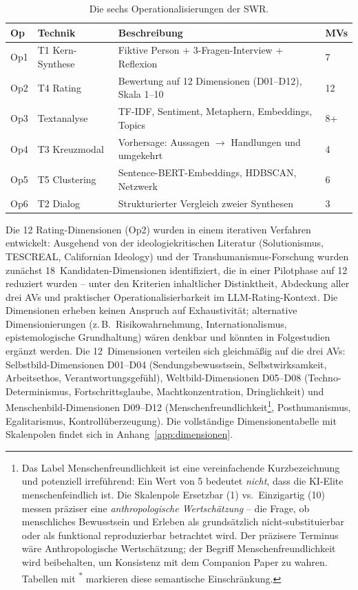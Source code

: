 \documentclass[12pt,a4paper]{article}
\begin{document}
\begin{table}[htbp]
  \centering
  \caption{Die sechs Operationalisierungen der SWR.}
  \label{tab:ops}
  \small
  \begin{tabularx}{\textwidth}{l l X l}
    \toprule
    \textbf{Op} & \textbf{Technik} & \textbf{Beschreibung} & \textbf{MVs} \\
    \midrule
    Op1 & T1 Kern-Synthese & Fiktive Person + 3-Fragen-Interview + Reflexion & 7 \\
    Op2 & T4 Rating & Bewertung auf 12 Dimensionen (D01--D12), Skala 1--10 & 12 \\
    Op3 & Textanalyse & TF-IDF, Sentiment, Metaphern, Embeddings, Topics & 8+ \\
    Op4 & T3 Kreuzmodal & Vorhersage: Aussagen $\to$ Handlungen und umgekehrt & 4 \\
    Op5 & T5 Clustering & Sentence-BERT-Embeddings, HDBSCAN, Netzwerk & 6 \\
    Op6 & T2 Dialog & Strukturierter Vergleich zweier Synthesen & 3 \\
    \bottomrule
  \end{tabularx}
\end{table}

Die 12 Rating-Dimensionen (Op2) wurden in einem iterativen Verfahren entwickelt: Ausgehend von der ideologiekritischen Literatur (Solutionismus, TESCREAL, Californian Ideology) und der Transhumanismus-Forschung wurden zun\"achst 18~Kandidaten-Dimensionen identifiziert, die in einer Pilotphase auf 12 reduziert wurden -- unter den Kriterien inhaltlicher Distinktheit, Abdeckung aller drei AVs und praktischer Operationalisierbarkeit im LLM-Rating-Kontext. Die Dimensionen erheben keinen Anspruch auf Exhaustivit\"at; alternative Dimensionierungen (z.\,B.\ Risikowahrnehmung, Internationalismus, epistemologische Grundhaltung) w\"aren denkbar und k\"onnten in Folgestudien erg\"anzt werden. Die 12~Dimensionen verteilen sich gleichm\"a\ss{}ig auf die drei AVs: Selbstbild-Dimensionen D01--D04 (Sendungsbewusstsein, Selbstwirksamkeit, Arbeitsethos, Verantwortungsgef\"uhl), Weltbild-Dimensionen D05--D08 (Techno-Determinismus, Fortschrittsglaube, Machtkonzentration, Dringlichkeit) und Menschenbild-Dimensionen D09--D12 (Menschenfreundlichkeit\footnote{Das Label \glqq Menschenfreundlichkeit\grqq{} ist eine vereinfachende Kurzbezeichnung und potenziell irref\"uhrend: Ein Wert von 5 bedeutet \emph{nicht}, dass die KI-Elite \glqq menschenfeindlich\grqq{} ist. Die Skalenpole \glqq Ersetzbar\grqq{} (1) vs.\ \glqq Einzigartig\grqq{} (10) messen pr\"aziser eine \emph{anthropologische Wertsch\"atzung} -- die Frage, ob menschliches Bewusstsein und Erleben als grunds\"atzlich nicht-substituierbar oder als funktional reproduzierbar betrachtet wird. Der pr\"azisere Terminus w\"are \glqq Anthropologische Wertsch\"atzung\grqq; der Begriff \glqq Menschenfreundlichkeit\grqq{} wird beibehalten, um Konsistenz mit dem Companion Paper \citep{Geiger2026SWR} zu wahren. Tabellen mit \textsuperscript{*} markieren diese semantische Einschr\"ankung.}, Posthumanismus, Egalitarismus, Kontroll\"uberzeugung). Die vollst\"andige Dimensionentabelle mit Skalenpolen findet sich in Anhang~\ref{app:dimensionen}.
\end{document}
